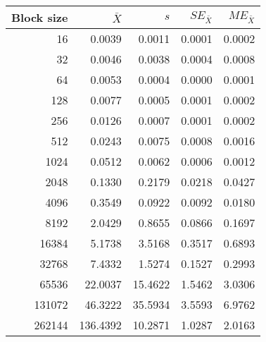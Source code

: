 \begin{tabular}{rrrrr}\toprule
{\small Block size} & $\bar{X}$ & $s$ & $SE_{\bar{X}}$ & $ME_{\bar{X}}$ \\\midrule
16 & 0.0039 & 0.0011 & 0.0001 & 0.0002\\
32 & 0.0046 & 0.0038 & 0.0004 & 0.0008\\
64 & 0.0053 & 0.0004 & 0.0000 & 0.0001\\
128 & 0.0077 & 0.0005 & 0.0001 & 0.0002\\
256 & 0.0126 & 0.0007 & 0.0001 & 0.0002\\
512 & 0.0243 & 0.0075 & 0.0008 & 0.0016\\
1024 & 0.0512 & 0.0062 & 0.0006 & 0.0012\\
2048 & 0.1330 & 0.2179 & 0.0218 & 0.0427\\
4096 & 0.3549 & 0.0922 & 0.0092 & 0.0180\\
8192 & 2.0429 & 0.8655 & 0.0866 & 0.1697\\
16384 & 5.1738 & 3.5168 & 0.3517 & 0.6893\\
32768 & 7.4332 & 1.5274 & 0.1527 & 0.2993\\
65536 & 22.0037 & 15.4622 & 1.5462 & 3.0306\\
131072 & 46.3222 & 35.5934 & 3.5593 & 6.9762\\
262144 & 136.4392 & 10.2871 & 1.0287 & 2.0163\\
\bottomrule
\end{tabular}
